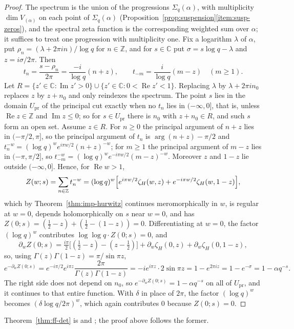 \documentclass[11pt]{amsart}
\theoremstyle{plain}
\theoremstyle{definition}
\theoremstyle{remark}
\numberwithin{equation}{section}
\newcommand{\C}{\mathbb{C}}
\newcommand{\Z}{\mathbb{Z}}
\DeclareMathOperator{\Ima}{Im}
\DeclareMathOperator{\Rea}{Re}
\renewcommand{\Re}{\Rea}
\renewcommand{\Im}{\Ima}
\begin{document}
\begin{proof}
The spectrum is the union of the progressions $\Sigma_q(\alpha)$, with
multiplicity $\dim V_{(\alpha)}$ on each point of $\Sigma_q(\alpha)$
(Proposition~\ref{prop:suspension}\ref{item:susp-zeros}), and the
spectral zeta function is the corresponding weighted sum over $\alpha$;
it suffices to treat one progression with multiplicity one. Fix a
logarithm $\lambda$ of $\alpha$, put $\rho_n=(\lambda+2\pi in)/\log q$
for $n\in\Z$, and for $s\in\C$ put $\sigma=s\log q-\lambda$ and
$z=i\sigma/2\pi$. Then
\[
t_n=\frac{s-\rho_n}{2\pi}=\frac{-i}{\log q}(n+z),\qquad
t_{-m}=\frac{i}{\log q}(m-z)\quad(m\ge1).
\]
Let $R=\{z'\in\C:\Im z'>0\}\cup\{z'\in\C:0<\Re z'<1\}$. Replacing
$\lambda$ by $\lambda+2\pi in_0$ replaces $z$ by $z+n_0$ and only
reindexes the spectrum. The point $s$ lies in the domain
$U_{\mathrm{pr}}$ of the principal cut exactly when no $t_n$ lies in
$(-\infty,0]$, that is,
unless $\Re z\in\Z$ and $\Im z\le0$; so for $s\in U_{\mathrm{pr}}$ there
is $n_0$ with $z+n_0\in R$, and such $s$ form an open set. Assume
$z\in R$. For $n\ge0$ the principal argument of $n+z$ lies in
$(-\pi/2,\pi]$, so the principal argument of $t_n$ is
$\arg(n+z)-\pi/2$ and $t_n^{-w}=(\log q)^we^{i\pi w/2}(n+z)^{-w}$; for
$m\ge1$ the principal argument of $m-z$ lies in $(-\pi,\pi/2]$, so
$t_{-m}^{-w}=(\log q)^we^{-i\pi w/2}(m-z)^{-w}$. Moreover $z$ and
$1-z$ lie outside $(-\infty,0]$. Hence, for $\Re w>1$,
\[
Z(w;s)=\sum_{n\in\Z}t_n^{-w}=(\log q)^w\Bigl[e^{i\pi w/2}\zeta_H(w,z)
+e^{-i\pi w/2}\zeta_H(w,1-z)\Bigr],
\]
which by Theorem~\ref{thm:imp-hurwitz} continues meromorphically in
$w$, is regular at $w=0$, depends holomorphically on $s$ near $w=0$,
and has $Z(0;s)=(\tfrac12-z)+(\tfrac12-(1-z))=0$. Differentiating at
$w=0$, the factor $(\log q)^w$ contributes $\log\log q\cdot Z(0;s)=0$,
and
\[
\partial_wZ(0;s)=\tfrac{i\pi}2\bigl[(\tfrac12-z)-(z-\tfrac12)\bigr]
+\partial_w\zeta_H(0,z)+\partial_w\zeta_H(0,1-z),
\]
so, using $\Gamma(z)\Gamma(1-z)=\pi/\sin\pi z$,
\[
e^{-\partial_wZ(0;s)}=e^{-i\pi/2}e^{i\pi z}\frac{2\pi}{\Gamma(z)
\Gamma(1-z)}=-ie^{i\pi z}\cdot2\sin\pi z=1-e^{2\pi iz}=1-e^{-\sigma}
=1-\alpha q^{-s}.
\]
The right side does not depend on $n_0$, so
$e^{-\partial_wZ(0;s)}=1-\alpha q^{-s}$ on all of $U_{\mathrm{pr}}$,
and it continues to that entire function. With $\delta$ in place of
$2\pi$, the factor $(\log q)^w$ becomes $(\delta\log q/2\pi)^w$, which
again contributes $0$ because $Z(0;s)=0$.
\end{proof}

Theorem~\ref{thm:ff-det} is \cite[(2.7), pp.~8--9, and (2.8), p.~10]%
{Deninger1994Motivic} and \cite[Proposition~7.1; p.~21 of the arXiv version]%
{Hesselholt2016THHZeta}; the proof above follows the former.
\end{document}
